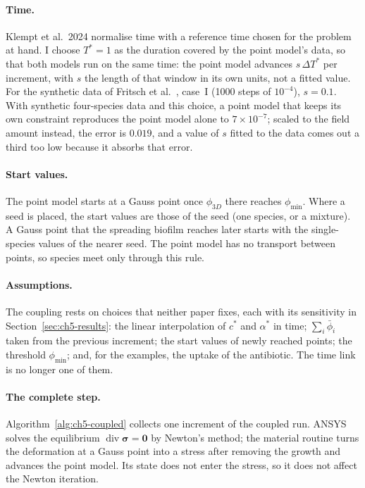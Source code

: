 \paragraph{Time.}
Klempt et al.\ 2024 normalise time with a reference time chosen for the problem at hand. I choose
$T^*=1$ as the duration covered by the point model's data, so that both models run on the same time: the
point model advances $s\,\Delta T^*$ per increment, with $s$ the length of that window in its own units,
not a fitted value. For the synthetic data of Fritsch et al.~\cite{Fritsch2025BayesianMicrofilms},
case~I (1000 steps of $10^{-4}$), $s=0.1$. With synthetic four-species data and this choice, a point
model that keeps its own constraint reproduces the point model alone to $7\times10^{-7}$; scaled to the
field amount instead, the error is $0.019$, and a value of $s$ fitted to the data comes out a third too
low because it absorbs that error.

\paragraph{Start values.}
The point model starts at a Gauss point once $\phi_{3D}$ there reaches $\phi_{\min}$. Where a seed is
placed, the start values are those of the seed (one species, or a mixture). A Gauss point that the
spreading biofilm reaches later starts with the single-species values of the nearer seed. The point
model has no transport between points, so species meet only through this rule.

\paragraph{Assumptions.} The coupling rests on choices that neither paper fixes, each with its
sensitivity in Section~\ref{sec:ch5-results}: the linear interpolation of $c^*$ and $\alpha^*$ in time;
$\sum_i\bar\phi_i$ taken from the previous increment; the start values of newly reached points; the
threshold $\phi_{\min}$; and, for the examples, the uptake of the antibiotic. The time link is no longer
one of them.

\paragraph{The complete step.} Algorithm~\ref{alg:ch5-coupled} collects one increment of the coupled
run. ANSYS solves the equilibrium $\operatorname{div}\boldsymbol\sigma=\mathbf 0$ by Newton's method;
the material routine turns the deformation at a Gauss point into a stress after removing the growth and
advances the point model. Its state does not enter the stress, so it does not affect the Newton
iteration.

